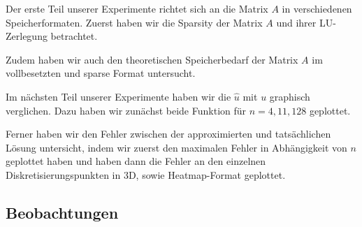 \documentclass{scrartcl}
\theoremstyle{remark}
\begin{document}
Der erste Teil unserer Experimente richtet sich an die Matrix \(A\) in verschiedenen Speicherformaten.
Zuerst haben wir die Sparsity der Matrix \(A\) und ihrer LU-Zerlegung betrachtet.


Zudem haben wir auch den theoretischen Speicherbedarf der Matrix \(A\) im vollbesetzten und sparse Format untersucht.


Im nächsten Teil unserer Experimente haben wir die \(\hat{u}\) mit \(u\) graphisch verglichen.
Dazu haben wir zunächst beide Funktion für \(n = 4, 11, 128\) geplottet.


Ferner haben wir den Fehler zwischen der approximierten und tatsächlichen Lösung untersicht, indem wir zuerst den maximalen Fehler
in Abhängigkeit von \(n\) geplottet haben und haben dann die Fehler an den einzelnen Diskretisierungspunkten in 3D, sowie Heatmap-Format
geplottet.



\subsection{Beobachtungen}

\end{document}
